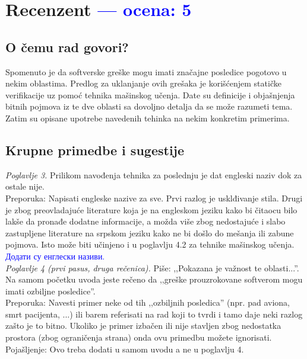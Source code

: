 \documentclass[a4paper]{report}
\newcommand{\odgovor}[1]{\textcolor{blue}{#1}}
\begin{document}
\chapter{Recenzent \odgovor{--- ocena: 5} }


\section{O čemu rad govori?}
Spomenuto je da softverske greške mogu imati značajne posledice pogotovo u nekim oblastima. Predlog za uklanjanje ovih grešaka je korišćenjem statičke verifikacije uz pomoć tehnika mašinskog učenja. Date su definicije i objašnjenja bitnih pojmova iz te dve oblasti sa dovoljno detalja da se može razumeti tema. Zatim su opisane upotrebe navedenih tehinka na nekim konkretim primerima.


\section{Krupne primedbe i sugestije}
\textit{Poglavlje 3.} Prilikom navođenja tehnika za poslednju je dat engleski naziv dok za ostale nije. \\
\indent Preporuka: Napisati engleske nazive za sve. Prvi razlog je usklđivanje stila. Drugi je zbog preovladajuće literature koja je na engleskom jeziku kako bi čitaocu bilo lakše da pronađe dodatne informacije, a možda više zbog nedostajuće i slabo zastupljene literature na srpskom jeziku kako ne bi došlo do mešanja ili zabune pojmova. Isto može biti učinjeno i u poglavlju 4.2 za tehnike mašinskog učenja. \\

\odgovor{Додати су енглески називи.} \\

\textit{Poglavlje 4 (prvi pasus, druga rečenica).} Piše: ,,Pokazana je važnost te oblasti...''. Na samom početku uvoda jeste rečeno da ,,greške prouzrokovane softverom mogu imati ozbiljne posledice''. \\ 
\indent Preporuka: Navesti primer neke od tih ,,ozbiljnih posledica'' (npr. pad aviona, smrt pacijenta, ...) ili barem referisati na rad koji to tvrdi i tamo daje neki razlog zašto je to bitno. Ukoliko je primer izbačen ili nije stavljen zbog nedostatka prostora (zbog ograničenja strana) onda ovu primedbu možete ignorisati. \\
\indent Pojašljenje: Ovo treba dodati u samom uvodu a ne u poglavlju 4. \\
\end{document}
